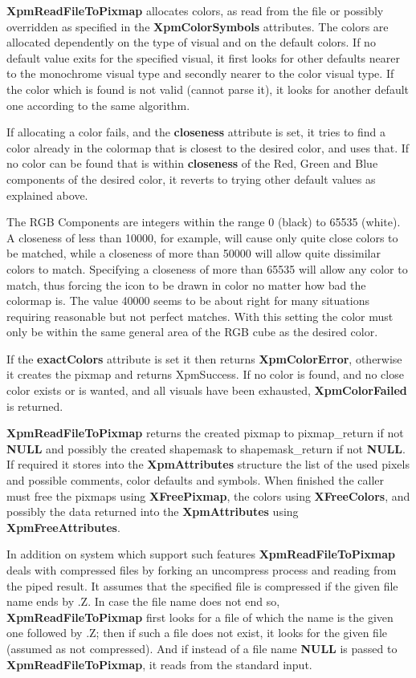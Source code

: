 {\bf XpmReadFileToPixmap} allocates colors, as read from the file or possibly
overridden as specified in the {\bf XpmColorSymbols} attributes. The colors
are allocated dependently on the type of visual and on the default colors. If
no default value exits for the specified visual, it first looks for other
defaults nearer to the monochrome visual type and secondly nearer to the color
visual type. If the color which is found is not valid (cannot parse it), it
looks for another default one according to the same algorithm.

If allocating a color fails, and the {\bf closeness} attribute is set, it
tries to find a color already in the colormap that is closest to the desired
color, and uses that. If no color can be found that is within {\bf closeness}
of the Red, Green and Blue components of the desired color, it reverts to
trying other default values as explained above.

The RGB Components are integers within the range 0 (black) to 65535 (white).
A closeness of less than 10000, for example, will cause only quite close colors
to be matched, while a closeness of more than 50000 will allow quite
dissimilar colors to match. Specifying a closeness of more than 65535 will
allow any color to match, thus forcing the icon to be drawn in color no matter
how bad the colormap is. The value 40000 seems to be about right for many
situations requiring reasonable but not perfect matches. With this setting the
color must only be within the same general area of the RGB cube as the desired
color.

If the {\bf exactColors} attribute is set it then returns {\bf XpmColorError},
otherwise it creates the pixmap and returns XpmSuccess. If no color is found,
and no close color exists or is wanted, and all visuals have been exhausted,
{\bf XpmColorFailed} is returned.

{\bf XpmReadFileToPixmap} returns the created pixmap to pixmap\_return if not
{\bf NULL} and possibly the created shapemask to shapemask\_return if not
{\bf NULL}. If required it stores into the {\bf XpmAttributes} structure the
list of the used pixels and possible comments, color defaults and symbols.
When finished the caller must free the pixmaps using {\bf XFreePixmap}, the
colors using {\bf XFreeColors}, and possibly the data returned into the
{\bf XpmAttributes} using {\bf XpmFreeAttributes}.

In addition on system which support such features {\bf XpmReadFileToPixmap}
deals with compressed files by forking an uncompress process and reading from
the piped result. It assumes that the specified file is compressed if the
given file name ends by .Z. In case the file name does not end so, {\bf
XpmReadFileToPixmap} first looks for a file of which the name is the given one
followed by .Z; then if such a file does not exist, it looks for the given
file (assumed as not compressed). And if instead of a file name {\bf NULL} is
passed to {\bf XpmReadFileToPixmap}, it reads from the standard input.

